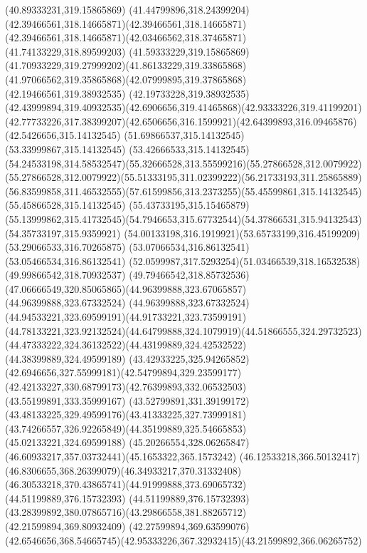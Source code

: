 {{\closepath
\moveto(40.89333231,319.15865869)
\curveto(41.44799896,318.24399204)(42.39466561,318.14665871)(42.39466561,318.14665871)
\curveto(42.39466561,318.14665871)(42.03466562,318.37465871)(41.74133229,318.89599203)
\curveto(41.59333229,319.15865869)(41.70933229,319.27999202)(41.86133229,319.33865868)
\curveto(41.97066562,319.35865868)(42.07999895,319.37865868)(42.19466561,319.38932535)
\lineto(42.19733228,319.38932535)
\curveto(42.43999894,319.40932535)(42.6906656,319.41465868)(42.93333226,319.41199201)
\curveto(42.77733226,317.38399207)(42.6506656,316.1599921)(42.64399893,316.09465876)
\lineto(42.5426656,315.14132545)
\lineto(51.69866537,315.14132545)
\lineto(53.33999867,315.14132545)
\lineto(53.42666533,315.14132545)
\curveto(54.24533198,314.58532547)(55.32666528,313.55599216)(55.27866528,312.0079922)
\curveto(55.27866528,312.0079922)(55.51333195,311.02399222)(56.21733193,311.25865889)
\curveto(56.83599858,311.46532555)(57.61599856,313.2373255)(55.45599861,315.14132545)
\lineto(55.45866528,315.14132545)
\lineto(55.43733195,315.15465879)
\curveto(55.13999862,315.41732545)(54.7946653,315.67732544)(54.37866531,315.94132543)
\lineto(54.35733197,315.9359921)
\curveto(54.00133198,316.1919921)(53.65733199,316.45199209)(53.29066533,316.70265875)
\lineto(53.07066534,316.86132541)
\lineto(53.05466534,316.86132541)
\curveto(52.0599987,317.5293254)(51.03466539,318.16532538)(49.99866542,318.70932537)
\curveto(49.79466542,318.85732536)(47.06666549,320.85065865)(44.96399888,323.67065857)
\lineto(44.96399888,323.67332524)
\curveto(44.96399888,323.67332524)(44.94533221,323.69599191)(44.91733221,323.73599191)
\curveto(44.78133221,323.92132524)(44.64799888,324.1079919)(44.51866555,324.29732523)
\curveto(44.47333222,324.36132522)(44.43199889,324.42532522)(44.38399889,324.49599189)
\curveto(43.42933225,325.94265852)(42.6946656,327.55999181)(42.54799894,329.23599177)
\curveto(42.42133227,330.68799173)(42.76399893,332.06532503)(43.55199891,333.35999167)
\curveto(43.52799891,331.39199172)(43.48133225,329.49599176)(43.41333225,327.73999181)
\curveto(43.74266557,326.92265849)(44.35199889,325.54665853)(45.02133221,324.69599188)
\curveto(45.20266554,328.06265847)(46.60933217,357.03732441)(45.1653322,365.1573242)
\curveto(46.12533218,366.50132417)(46.8306655,368.26399079)(46.34933217,370.31332408)
\curveto(46.30533218,370.43865741)(44.91999888,373.69065732)(44.51199889,376.15732393)
\curveto(44.51199889,376.15732393)(43.28399892,380.07865716)(43.29866558,381.88265712)
\lineto(42.21599894,369.80932409)
\lineto(42.27599894,369.63599076)
\curveto(42.6546656,368.54665745)(42.95333226,367.32932415)(43.21599892,366.06265752)
}}
